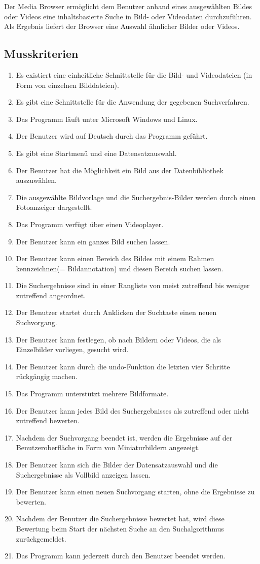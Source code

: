 Der Media Browser ermöglicht dem Benutzer anhand eines ausgewählten Bildes oder Videos eine inhaltsbasierte Suche in Bild- oder Videodaten durchzuführen. Als Ergebnis liefert der Browser eine Auswahl ähnlicher Bilder oder Videos.
\subsection{Musskriterien}
\begin{enumerate} [label=\bfseries /MK \arabic*0/]
\item Es existiert eine einheitliche Schnittstelle für die Bild- und Videodateien (in Form von einzelnen Bilddateien).
\item Es gibt eine Schnittstelle für die Anwendung der gegebenen Suchverfahren.
\item Das Programm läuft unter Microsoft Windows und Linux.
\item Der Benutzer wird auf Deutsch durch das Programm geführt.
\item Es gibt eine Startmenü und eine Datensatzauswahl.
\item Der Benutzer hat die Möglichkeit ein Bild aus der Datenbibliothek auszuwählen.
\item Die ausgewählte Bildvorlage und die Suchergebnis-Bilder werden durch einen Fotoanzeiger dargestellt.
\item Das Programm verfügt über einen Videoplayer.
\item Der Benutzer kann ein ganzes Bild suchen lassen.
\item Der Benutzer kann einen Bereich des Bildes mit einem Rahmen kennzeichnen(= Bildannotation) und diesen Bereich suchen lassen.
\item Die Suchergebnisse sind in einer Rangliste von meist zutreffend bis weniger zutreffend angeordnet.
\item Der Benutzer startet durch Anklicken der Suchtaste einen neuen Suchvorgang.
\item Der Benutzer kann festlegen, ob nach Bildern oder Videos, die als Einzelbilder vorliegen, gesucht wird.
\item Der Benutzer kann durch die undo-Funktion die letzten vier Schritte rückgängig machen.
\item Das Programm unterstützt mehrere Bildformate.
\item Der Benutzer kann jedes Bild des Suchergebnisses als zutreffend oder nicht zutreffend bewerten.
\item Nachdem der Suchvorgang beendet ist, werden die Ergebnisse auf der Benutzeroberfläche in Form von Miniaturbildern angezeigt.
\item Der Benutzer kann sich die Bilder der Datensatzauswahl und die Suchergebnisse als Vollbild anzeigen lassen.
\item Der Benutzer kann einen neuen Suchvorgang starten, ohne die Ergebnisse zu bewerten.
\item Nachdem der Benutzer die Suchergebnisse bewertet hat, wird diese Bewertung beim Start der nächsten Suche an den Suchalgorithmus zurückgemeldet.
\item Das Programm kann jederzeit durch den Benutzer beendet werden.
\end{enumerate}
